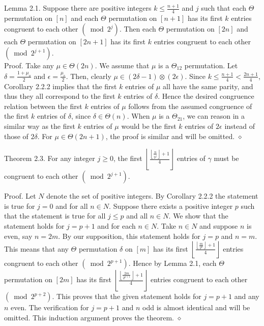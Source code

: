 \documentclass[10pt]{article}
\newcommand{\proofend}{\hfill\(\diamond\)}
\begin{document}
Lemma 2.1. Suppose there are positive integers $k \leq \frac{n+1}{4}$ and $j$ such that each $\Theta$ permutation on $[n]$ and each $\Theta$ permutation on $[n+1]$ has its first $k$ entries congruent to each other $\left(\bmod 2^{j}\right)$. Then each $\Theta$ permutation on $[2 n]$ and each $\Theta$ permutation on $[2 n+1]$ has its first $k$ entries congruent to each other $\left(\bmod 2^{j+1}\right)$.\\
Proof. Take any $\mu \in \Theta(2 n)$. We assume that $\mu$ is a $\Theta_{12}$ permutation. Let $\delta=\frac{1+\mu_{o}}{2}$ and $\epsilon=\frac{\mu_{e}}{2}$. Then, clearly $\mu \in(2 \delta-1) \otimes(2 \epsilon)$. Since $k \leq \frac{n+1}{4}<\frac{2n+1}{4}$, Corollary 2.2.2 implies that the first $k$ entries of $\mu$ all have the same parity, and thus they all correspond to the first $k$ entries of $\delta$. Hence the desired congruence relation between the first $k$ entries of $\mu$ follows from the assumed congruence of the first $k$ entries of $\delta$, since $\delta \in \Theta(n)$. When $\mu$ is a $\Theta_{21}$, we can reason in a similar way as the first $k$ entries of $\mu$ would be the first $k$ entries of $2 \epsilon$ instead of those of $2 \delta$. For $\mu \in \Theta(2 n+1)$, the proof is similar and will be omitted. \proofend

Theorem 2.3. For any integer $j \geq 0$, the first $\left\lfloor\frac{\left\lfloor\frac{n}{2^{j}}\right\rfloor+1}{4}\right\rfloor$ entries of $\gamma$ must be congruent to each other $\left(\bmod 2^{j+1}\right)$.

Proof. Let $N$ denote the set of positive integers. By Corollary 2.2.2 the statement is true for $j=0$ and for all $n \in N$. Suppose there exists a positive integer $p$ such that the statement is true for all $j \leq p$ and all $n \in N$. We show that the statement holds for $j=p+1$ and for each $n \in N$. Take $n \in N$ and suppose $n$ is even, say $n=2 m$. By our supposition, this statement holds for $j=p$ and $n=m$. This means that any $\Theta$ permutation $\delta$ on $[m]$ has its first $\left\lfloor\frac{\left\lfloor\frac{m}{2^{p}}\right\rfloor+1}{4}\right\rfloor$ entries congruent to each other $\left(\bmod 2^{p+1}\right)$. Hence by Lemma 2.1, each $\Theta$ permutation on $[2 m]$ has its first $\left\lfloor\frac{\left\lfloor\frac{2m}{2^{p+1}}\right\rfloor+1}{4}\right\rfloor$ entries congruent to each other $\left(\bmod 2^{p+2}\right)$. This proves that the given statement holds for $j=p+1$ and any $n$ even. The verification for $j=p+1$ and $n$ odd is almost identical and will be omitted. This induction argument proves the theorem. \proofend
\end{document}
